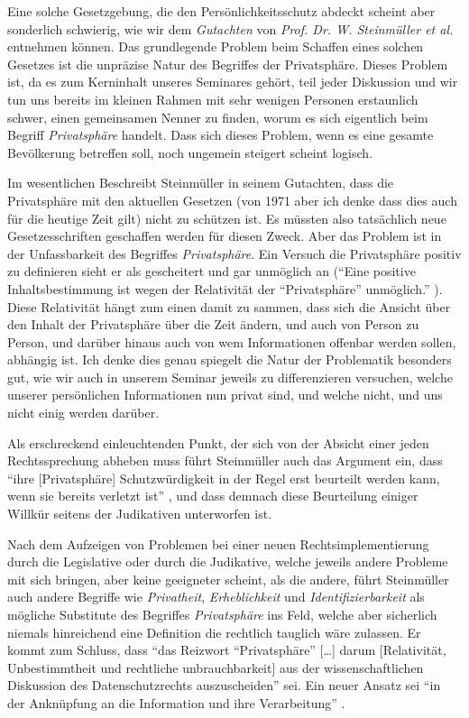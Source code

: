 \documentclass[a4paper,ngerman,11pt]{scrartcl}
\begin{document}
Eine solche Gesetzgebung, die den Persönlichkeitsschutz abdeckt scheint aber
sonderlich schwierig, wie wir dem \emph{Gutachten} von \emph{Prof. Dr. W. Steinmüller et
al.} entnehmen können. Das grundlegende Problem beim Schaffen eines solchen
Gesetzes ist die unpräzise Natur des Begriffes der Privatsphäre. Dieses
Problem ist, da es zum Kerninhalt unseres Seminares gehört, teil jeder
Diskussion und wir tun uns bereits im kleinen Rahmen mit sehr wenigen Personen
erstaunlich schwer, einen gemeinsamen Nenner zu finden, worum es sich
eigentlich beim Begriff \emph{Privatsphäre} handelt. Dass sich dieses Problem, wenn
es eine gesamte Bevölkerung betreffen soll, noch ungemein steigert scheint
logisch.

Im wesentlichen Beschreibt Steinmüller in seinem Gutachten, dass die
Privatsphäre mit den aktuellen Gesetzen (von 1971 aber ich denke dass dies
auch für die heutige Zeit gilt) nicht zu schützen ist.\cite{Datenschutz1971} Es
müssten also tatsächlich neue Gesetzesschriften geschaffen werden für diesen
Zweck. Aber das Problem ist in der Unfassbarkeit des Begriffes
\emph{Privatsphäre}. Ein Versuch die Privatsphäre positiv zu definieren sieht er
als gescheitert und gar unmöglich an (``Eine positive Inhaltsbestimmung ist
wegen der Relativität der ``Privatsphäre'' unmöglich.''
\cite{Datenschutz1971}). Diese Relativität hängt zum einen damit zu sammen, dass
sich die Ansicht über den Inhalt der Privatsphäre über die Zeit ändern, und
auch von Person zu Person, und darüber hinaus auch von wem Informationen
offenbar werden sollen, abhängig ist.\cite{Datenschutz1971} Ich denke dies genau
spiegelt die Natur der Problematik besonders gut, wie wir auch in unserem
Seminar jeweils zu differenzieren versuchen, welche unserer persönlichen
Informationen nun privat sind, und welche nicht, und uns nicht einig werden
darüber.

Als erschreckend einleuchtenden Punkt, der sich von der Absicht einer jeden
Rechtssprechung abheben muss führt Steinmüller auch das Argument ein, dass
``ihre [Privatsphäre] Schutzwürdigkeit in der Regel erst beurteilt werden
kann, wenn sie bereits verletzt ist'' \cite{Datenschutz1971}, und dass demnach
diese Beurteilung einiger Willkür seitens der Judikativen unterworfen ist.

Nach dem Aufzeigen von Problemen bei einer neuen Rechtsimplementierung durch
die Legislative oder durch die Judikative, welche jeweils andere Probleme mit
sich bringen, aber keine geeigneter scheint, als die andere, führt Steinmüller
auch andere Begriffe wie \emph{Privatheit}, \emph{Erheblichkeit} \cite{Datenschutz1971}
und \emph{Identifizierbarkeit} als mögliche Substitute des Begriffes \emph{Privatsphäre}
ins Feld, welche aber sicherlich niemals hinreichend eine Definition die
rechtlich tauglich wäre zulassen. Er kommt zum Schluss, dass ``das Reizwort
``Privatsphäre'' [\ldots{}] darum [Relativität, Unbestimmtheit und rechtliche
unbrauchbarkeit] aus der wissenschaftlichen Diskussion des Datenschutzrechts
auszuscheiden'' \cite{Datenschutz1971} sei. Ein neuer Ansatz sei ``in der
Anknüpfung an die Information und ihre Verarbeitung'' \cite{Datenschutz1971}.
\end{document}
